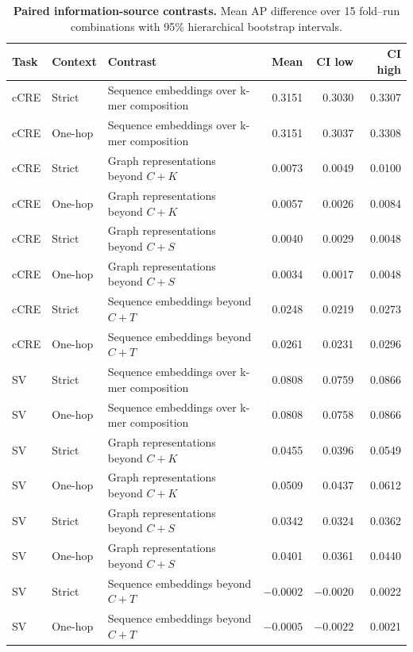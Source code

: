 \documentclass[11pt]{article}
\begin{document}
\begin{bibunit}[unsrtnat]
\begin{table}[H]
\centering
\caption{\textbf{Paired information-source contrasts.} Mean AP difference over 15 fold--run combinations with 95\% hierarchical bootstrap intervals.}
\label{S-stab:factorial}
\footnotesize
\begin{tabularx}{\linewidth}{@{}llXrrr@{}}
\toprule
Task & Context & Contrast & Mean & CI low & CI high \\
\midrule
cCRE & Strict & Sequence embeddings over k-mer composition & 0.3151 & 0.3030 & 0.3307 \\
cCRE & One-hop & Sequence embeddings over k-mer composition & 0.3151 & 0.3037 & 0.3308 \\
cCRE & Strict & Graph representations beyond $C+K$ & 0.0073 & 0.0049 & 0.0100 \\
cCRE & One-hop & Graph representations beyond $C+K$ & 0.0057 & 0.0026 & 0.0084 \\
cCRE & Strict & Graph representations beyond $C+S$ & 0.0040 & 0.0029 & 0.0048 \\
cCRE & One-hop & Graph representations beyond $C+S$ & 0.0034 & 0.0017 & 0.0048 \\
cCRE & Strict & Sequence embeddings beyond $C+T$ & 0.0248 & 0.0219 & 0.0273 \\
cCRE & One-hop & Sequence embeddings beyond $C+T$ & 0.0261 & 0.0231 & 0.0296 \\
\midrule
SV & Strict & Sequence embeddings over k-mer composition & 0.0808 & 0.0759 & 0.0866 \\
SV & One-hop & Sequence embeddings over k-mer composition & 0.0808 & 0.0758 & 0.0866 \\
SV & Strict & Graph representations beyond $C+K$ & 0.0455 & 0.0396 & 0.0549 \\
SV & One-hop & Graph representations beyond $C+K$ & 0.0509 & 0.0437 & 0.0612 \\
SV & Strict & Graph representations beyond $C+S$ & 0.0342 & 0.0324 & 0.0362 \\
SV & One-hop & Graph representations beyond $C+S$ & 0.0401 & 0.0361 & 0.0440 \\
SV & Strict & Sequence embeddings beyond $C+T$ & $-0.0002$ & $-0.0020$ & 0.0022 \\
SV & One-hop & Sequence embeddings beyond $C+T$ & $-0.0005$ & $-0.0022$ & 0.0021 \\
\bottomrule
\end{tabularx}
\end{table}


\end{bibunit}
\end{document}
